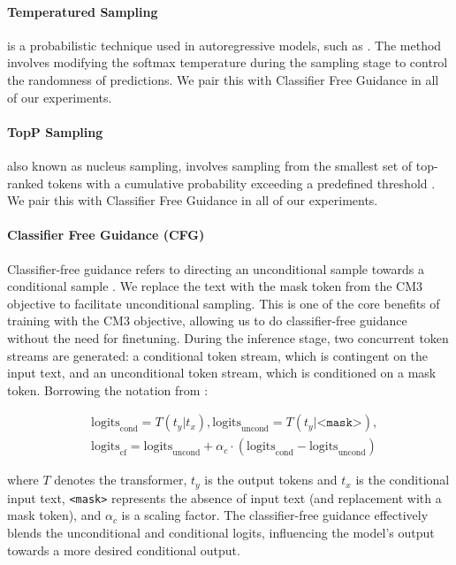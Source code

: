 \documentclass{article}
\begin{document}
\paragraph{Temperatured Sampling} is a probabilistic technique used in autoregressive models, such as \citet{DALLE}. The method involves modifying the softmax temperature during the sampling stage to control the randomness of predictions. We pair this with Classifier Free Guidance in all of our experiments.

\paragraph{TopP Sampling} also known as nucleus sampling, involves sampling from the smallest set of top-ranked tokens with a cumulative probability exceeding a predefined threshold \citep{holtzman2020nucleus}. We pair this with Classifier Free Guidance in all of our experiments.

\paragraph{Classifier Free Guidance (CFG)}
Classifier-free guidance refers to directing an unconditional sample towards a conditional sample \citep{make_a_scene}. We replace the text with the mask token from the CM3 objective to facilitate unconditional sampling. This is one of the core benefits of training with the CM3 objective, allowing us to do classifier-free guidance without the need for finetuning. During the inference stage, two concurrent token streams are generated: a conditional token stream, which is contingent on the input text, and an unconditional token stream, which is conditioned on a mask token. Borrowing the notation from \citet{make_a_scene}:

\begin{align}
&\text{logits}_{\text{cond}} = T(t_y|t_x), \text{logits}_{\text{uncond}} = T(t_y|\texttt{<mask>}), \\
&\text{logits}_{\text{cf}} = \text{logits}_{\text{uncond}} + \alpha_c \cdot (\text{logits}_{\text{cond}} - \text{logits}_{\text{uncond}}) \label{eq:logit_subtraction}
\end{align}

where $T$ denotes the transformer, $t_y$ is the output tokens and $t_x$ is the conditional input text, \texttt{<mask>} represents the absence of input text (and replacement with a mask token), and $\alpha_c$ is a scaling factor. The classifier-free guidance effectively blends the unconditional and conditional logits, influencing the model's output towards a more desired conditional output.
\end{document}

